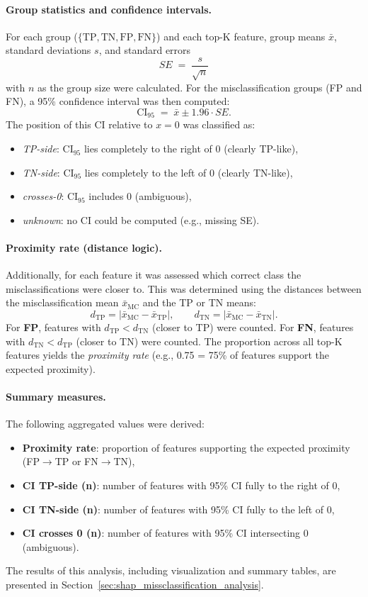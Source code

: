 \paragraph{Group statistics and confidence intervals.}
For each group (\(\{\mathrm{TP}, \mathrm{TN}, \mathrm{FP}, \mathrm{FN}\}\)) and each top-K feature, group means \(\bar{x}\), standard deviations \(s\), and standard errors
\[
SE \;=\; \frac{s}{\sqrt{n}}
\]
with \(n\) as the group size were calculated. For the misclassification groups (FP and FN), a 95\% confidence interval was then computed:
\[
\mathrm{CI}_{95} \;=\; \bar{x} \pm 1.96 \cdot SE.
\]
The position of this CI relative to \(x=0\) was classified as:
\begin{itemize}
  \item \emph{TP-side}: \(\mathrm{CI}_{95}\) lies completely to the right of 0 (clearly TP-like),
  \item \emph{TN-side}: \(\mathrm{CI}_{95}\) lies completely to the left of 0 (clearly TN-like),
  \item \emph{crosses-0}: \(\mathrm{CI}_{95}\) includes 0 (ambiguous),
  \item \emph{unknown}: no CI could be computed (e.g., missing SE).
\end{itemize}

\paragraph{Proximity rate (distance logic).}
Additionally, for each feature it was assessed which correct class the misclassifications were closer to. This was determined using the distances between the misclassification mean \(\bar{x}_{\mathrm{MC}}\) and the TP or TN means:
\[
d_{\mathrm{TP}} = \lvert \bar{x}_{\mathrm{MC}} - \bar{x}_{\mathrm{TP}} \rvert, \qquad
d_{\mathrm{TN}} = \lvert \bar{x}_{\mathrm{MC}} - \bar{x}_{\mathrm{TN}} \rvert.
\]
For \textbf{FP}, features with \(d_{\mathrm{TP}} < d_{\mathrm{TN}}\) (closer to TP) were counted. For \textbf{FN}, features with \(d_{\mathrm{TN}} < d_{\mathrm{TP}}\) (closer to TN) were counted. The proportion across all top-K features yields the \emph{proximity rate} (e.g., 0.75 = 75\% of features support the expected proximity).

\paragraph{Summary measures.}
The following aggregated values were derived:
\begin{itemize}
  \item \textbf{Proximity rate}: proportion of features supporting the expected proximity (FP\(\rightarrow\)TP or FN\(\rightarrow\)TN),
  \item \textbf{CI TP-side (n)}: number of features with 95\% CI fully to the right of 0,
  \item \textbf{CI TN-side (n)}: number of features with 95\% CI fully to the left of 0,
  \item \textbf{CI crosses 0 (n)}: number of features with 95\% CI intersecting 0 (ambiguous).
\end{itemize}

The results of this analysis, including visualization and summary tables, are presented in Section~\ref{sec:shap_missclassification_analysis}.


